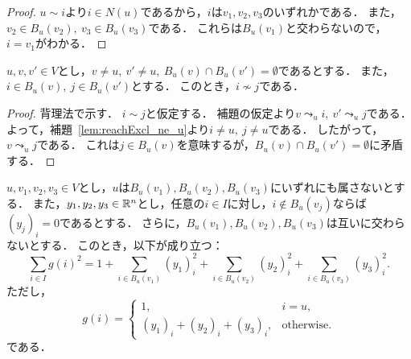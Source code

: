 \begin{proof}
  $u \sim i$より$i \in N(u)$であるから，$i$は$v_1, v_2, v_3$のいずれかである．
  また，$v_2 \in B_u(v_2),\ v_3 \in B_u(v_3)$である．
  これらは$B_u(v_1)$と交わらないので，$i = v_1$がわかる．
\end{proof}

\begin{lemma}
  \label{lem:branch_no_cross_edge}
  \leanok
  $u, v, v' \in V$とし，$v \ne u,\ v' \ne u,\ B_u(v) \cap B_u(v') = \emptyset$であるとする．
  また，$i \in B_u(v),\ j \in B_u(v')$とする．
  このとき，$i \not \sim j$である．
\end{lemma}

\begin{proof}
  背理法で示す．
  $i \sim j$と仮定する．
  補題の仮定より$v \leadsto_u i,\ v' \leadsto_u j$である．
  よって，補題~\ref{lem:reachExcl_ne_u}より$i \ne u,\ j \ne u$である．
  したがって，$v \leadsto_u j$である．
  これは$j \in B_u(v)$を意味するが，$B_u(v) \cap B_u(v') = \emptyset$に矛盾する．
\end{proof}

\begin{lemma}
  \label{lem:assembly_sq}
  \leanok
  \uses{}
  $u, v_1, v_2, v_3 \in V$とし，$u$は$B_u(v_1), B_u(v_2), B_u(v_3)$にいずれにも属さないとする．
  また，$y_1, y_2, y_3 \in \mathbb{R}^n$とし，任意の$i \in I$に対し，$i \notin B_u(v_j)$ならば$(y_j)_i = 0$であるとする．
  さらに，$B_u(v_1), B_u(v_2), B_u(v_3)$は互いに交わらないとする．
  このとき，以下が成り立つ：
  \begin{equation}
    \sum_{i \in I} g(i) ^ 2
    = 1 + \sum_{i \in B_u(v_1)} (y_1)_i ^ 2 + \sum_{i \in B_u(v_2)} (y_2)_i ^ 2 + \sum_{i \in B_u(v_3)} (y_3)_i ^ 2.
  \end{equation}
  ただし，
  \begin{equation}
    g(i) = \begin{cases}
      1, & i = u, \\
      (y_1)_i + (y_2)_i + (y_3)_i, & \textrm{otherwise}.
    \end{cases}
  \end{equation}
  である．
\end{lemma}

